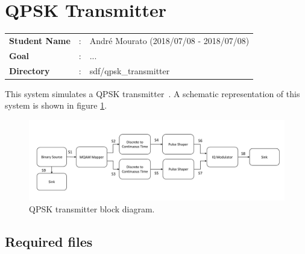 \section{QPSK Transmitter}

\begin{refsection}

\begin{tcolorbox}	
\begin{tabular}{p{2.75cm} p{0.2cm} p{10.5cm}} 	
\textbf{Student Name}  &:&  Andr\'e Mourato (2018/07/08 - 2018/07/08)\\
\textbf{Goal}          &:& ...\\
\textbf{Directory}     &:& sdf/qpsk\_transmitter
\end{tabular}
\end{tcolorbox}

This system simulates a QPSK transmitter~\cite{loudon2000}. A schematic representation of this system is shown in figure \ref{QPSK_transmitter_block_diagram_simple}.

\begin{figure}[h]
	\centering
	\includegraphics[width=1.0\textwidth]{./sdf/qpsk_transmitter/figures/qpsk_transmitter.pdf}
	\caption{QPSK transmitter block diagram.}\label{QPSK_transmitter_block_diagram_simple}
\end{figure}

\subsection*{Required files}\label{Required files}


\end{refsection}
